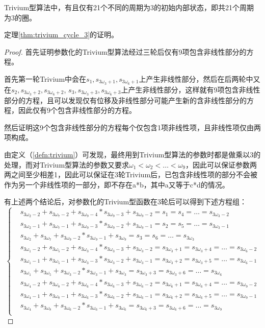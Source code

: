 \begin{thm}
\label{thm:trivium_cycle_3}
Trivium型算法中，有且仅有21个不同的周期为3的初始内部状态，即共21个周期为3的圈。

定理\ref{thm:trivium_cycle_3}的证明。
\begin{proof}
首先证明参数化的Trivium型算法经过三轮后仅有9项包含非线性部分的方程。

首先第一轮Trivium中会在$s_{1}, s_{3\omega_{3}+1}, s_{3\omega_{6}+1}$上产生非线性部分，然后在后两轮中又在$s_{2}, s_{3\omega_{3}+2}, s_{3\omega_{6}+2}$, $s_{3}, s_{3\omega_{3}+3}, s_{3\omega_{6}+3}$上产生非线性部分，这样就有9项包含非线性部分的方程，且可以发现仅有位移及非线性部分可能产生新的含非线性部分的方程，因此仅有9个包含非线性部分的方程。

然后证明这9个包含非线性部分的方程每个仅包含1项非线性项，且非线性项仅由两项构成。

由定义（\ref{defn:trivium}）可发现，最终用到Trivium型算法的参数时都是做乘以3的处理，而对Trivium型算法的参数又要求$\omega_1 < \omega_2 < \ldots < \omega_9$，因此可以保证参数两两之间至少相差1，因此可以保证在3轮Trivium后，已包含非线性项的部分不会被作为另一个非线性项的一部分，即不存在a*b，其中a又等于c*d的情况。

有上述两个结论后，对参数化的Trivium型函数在3轮后可以得到下述方程组：
\begin{equation}
\left\{
\begin{aligned}
&s_{3\omega_{2}-2}+s_{3\omega_{7}-2}+s_{3\omega_{9}-4}*s_{3\omega_{9}-3}+s_{3\omega_{9}-2}=s_{1}=s_{4}=\ldots=s_{3\omega_{3}-2}\\
&s_{3\omega_{2}-1}+s_{3\omega_{7}-1}+s_{3\omega_{9}-3}*s_{3\omega_{9}-2}+s_{3\omega_{9}-1}=s_{2}=s_{5}=\ldots=s_{3\omega_{3}-1}\\
&s_{3\omega_{2}}+s_{3\omega_{7}}+s_{3\omega_{9}-2}*s_{3\omega_{9}-1}+s_{3\omega_{9}}=s_{3}=s_{6}=\ldots=s_{3\omega_{3}}\\
&s_{3\omega_{1}-2}+s_{3\omega_{5}-2}+s_{3\omega_{3}-4}*s_{3\omega_{3}-3}+s_{3\omega_{3}-2}=s_{3\omega_{3}+1}=s_{3\omega_{3}+4}=\ldots=s_{3\omega_{6}-2}\\
&s_{3\omega_{1}-1}+s_{3\omega_{5}-1}+s_{3\omega_{3}-3}*s_{3\omega_{3}-2}+s_{3\omega_{3}-1}=s_{3\omega_{3}+2}=s_{3\omega_{3}+5}=\ldots=s_{3\omega_{6}-1}\\
&s_{3\omega_{1}}+s_{3\omega_{5}}+s_{3\omega_{3}-2}*s_{3\omega_{3}-1}+s_{3\omega_{3}}=s_{3\omega_{3}+3}=s_{3\omega_{3}+6}=\ldots=s_{3\omega_{6}}\\
&s_{3\omega_{4}-2}+s_{3\omega_{8}-2}+s_{3\omega_{6}-4}*s_{3\omega_{6}-3}+s_{3\omega_{6}-2}=s_{3\omega_{6}+1}=s_{3\omega_{6}+4}=\ldots=s_{3\omega_{9}-2}\\
&s_{3\omega_{4}-1}+s_{3\omega_{8}-1}+s_{3\omega_{6}-3}*s_{3\omega_{6}-2}+s_{3\omega_{6}-1}=s_{3\omega_{6}+2}=s_{3\omega_{6}+5}=\ldots=s_{3\omega_{9}-1}\\
&s_{3\omega_{4}}+s_{3\omega_{8}}+s_{3\omega_{6}-2}*s_{3\omega_{6}-1}+s_{3\omega_{6}}=s_{3\omega_{6}+3}=s_{3\omega_{6}+6}=\ldots=s_{3\omega_{9}}\\
\end{aligned}
\right.
\end{equation}




\end{proof}
\end{thm}
